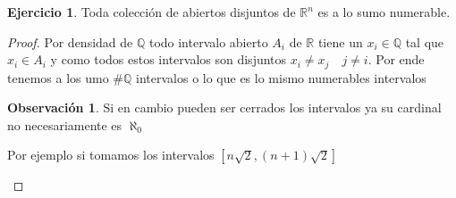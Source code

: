 \documentclass[12pt]{article}
\newcommand{\n}{\aleph_{0}}
\newcommand{\Q}{\mathbb{Q}}
\newcommand{\R}{\mathbb{R}}
\theoremstyle{definition}
\newtheorem*{remark}{Observación}
\newtheorem{ej}{Ejercicio}
\begin{document}
\begin{ej}
  Toda colección de abiertos disjuntos de $\R^n$ es a lo sumo numerable. 

  \begin{proof}
    Por densidad de $\Q$ todo intervalo abierto $A_{i}$ de $\R$ tiene un $x_{i} \in \Q$ tal que $x_{i} \in A_{i}$ y como todos estos intervalos son disjuntos $x_{i} \neq x_{j} \quad j \neq i$. Por ende tenemos a los umo $\# \Q$ intervalos o lo que es lo mismo numerables intervalos

    \begin{remark}
      Si en cambio pueden ser cerrados los intervalos ya su cardinal no necesariamente es $\n$ 

      Por ejemplo si tomamos los intervalos $[n \sqrt{2},(n+1) \sqrt{2} ]$
    \end{remark}
  \end{proof}
\end{ej}
\end{document}
